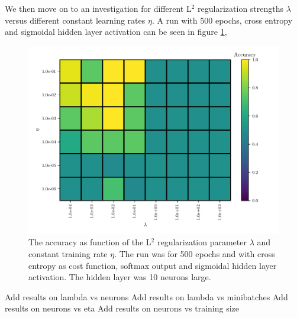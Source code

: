 We then move on to an investigation for different L$^2$ regularization strengths $\lambda$ versus different constant learning rates $\eta$. A run with 500 epochs, cross entropy and sigmoidal hidden layer activation can be seen in figure \ref{fig:mlp-eta-lambda},
\begin{figure}[H]
    \centering
    \includegraphics[scale=1.0]{../fig/mlp_lambda_eta.pdf}
    \caption{The accuracy as function of the L$^2$ regularization parameter $\lambda$ and constant training rate $\eta$. The run was for 500 epochs and with cross entropy as cost function, softmax output and sigmoidal hidden layer activation. The hidden layer was 10 neurons large.}
    \label{fig:mlp-eta-lambda}
\end{figure}

Add results on lambda vs neurons
Add results on lambda vs minibatches
Add results on neurons vs eta
Add results on neurons vs training size
